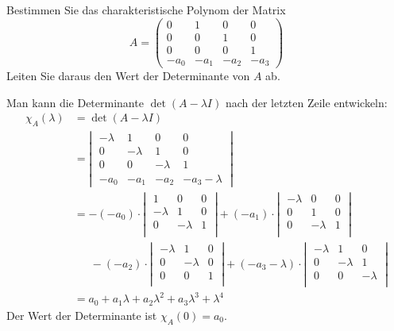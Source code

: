 Bestimmen Sie das charakteristische Polynom der Matrix
\[
A=\begin{pmatrix}
       0&       1&       0&       0\\
       0&       0&       1&       0\\
       0&       0&       0&       1\\
-a_0    &-a_1    &-a_2    &-a_3
\end{pmatrix}
\]
Leiten Sie daraus den Wert der Determinante von $A$ ab.


\begin{loesung}
Man kann die Determinante $\det(A-\lambda I)$ nach der letzten Zeile
entwickeln:
\begin{align*}
\chi_A(\lambda)&=\det(A-\lambda I)\\
&=\left|\;\begin{matrix}
-\lambda&       1&       0&       0\\
       0&-\lambda&       1&       0\\
       0&       0&-\lambda&       1\\
-a_0    &-a_1    &-a_2    &-a_3-\lambda
\end{matrix}\;\right|
\\
&=
-(-a_0)\cdot
\left|\;\begin{matrix}
       1&       0&       0\\
-\lambda&       1&       0\\
       0&-\lambda&       1\\
\end{matrix}\;\right|
+(-a_1)\cdot
\left|\;\begin{matrix}
-\lambda&       0&       0\\
       0&       1&       0\\
       0&-\lambda&       1\\
\end{matrix}\;\right|
\\
&\phantom{=}\,
-(-a_2)\cdot
\left|\;\begin{matrix}
-\lambda&       1&       0\\
       0&-\lambda&       0\\
       0&       0&       1\\
\end{matrix}\;\right|
+(-a_3-\lambda)\cdot
\left|\;\begin{matrix}
-\lambda&       1&       0\\
       0&-\lambda&       1\\
       0&       0&-\lambda\\
\end{matrix}\;\right|
\\
&=a_0+a_1\lambda+a_2\lambda^2+a_3\lambda^3+\lambda^4
\end{align*}
Der Wert der Determinante ist $\chi_A(0)=a_0$.
\end{loesung}

